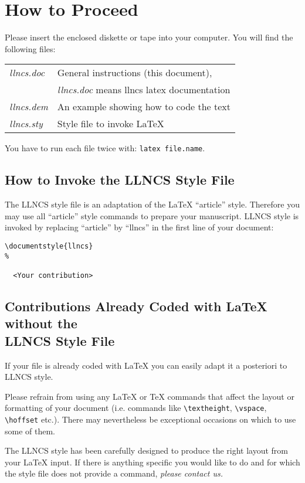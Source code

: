 \section{How to Proceed}
%
Please insert the enclosed diskette or tape into your computer. You will
find the following files:
\begin{flushleft}
\begin{tabular}{@{}p{2.5cm}l}
{\it llncs.doc}  & General instructions (this document),\\
        & {\it llncs.doc} means llncs latex documentation\\
{\it llncs.dem}  & An example showing how to code the text\\
{\it llncs.sty}  & Style file to invoke  \LaTeX{}
\end{tabular}
\end{flushleft}
You have to run each file twice with: \verb|latex file.name|.
%
\subsection{How to Invoke the LLNCS Style File}
%
The LLNCS style file is an adaptation of the \LaTeX{} ``article'' style.
Therefore you may use all ``article'' style commands to prepare your
manuscript.
LLNCS style is invoked by replacing ``article'' by ``llncs'' in the
first
line of your document:
\begin{verbatim}
\documentstyle{llncs}
%

  <Your contribution>

\end{verbatim}
%
\subsection{Contributions Already  Coded with \protect\LaTeX{} without
the \protect\\ LLNCS Style File}
%
If your file is already coded with \LaTeX{} you can easily
adapt it a posteriori to LLNCS style.

Please refrain from using any \LaTeX{} or \TeX{} commands
that affect the layout or formatting of your document (i.e. commands
like \verb|\textheight|, \verb|\vspace|, \verb|\hoffset| etc.).
There may nevertheless be exceptional occasions on which to
use some of them.

The LLNCS style has been carefully designed to produce the right layout
from your \LaTeX{} input. If there is anything specific you would like
to do and  for which the style file does not provide a command,
{\em please contact us.\/}
%
